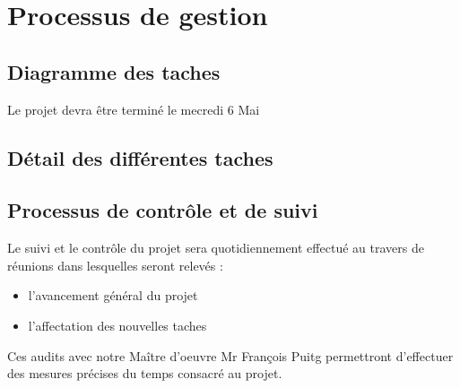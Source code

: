 
\section{Processus de gestion}
\subsection{Diagramme des taches}

Le projet devra être terminé le mecredi 6 Mai

\subsection{Détail des différentes taches}


\subsection{Processus de contrôle et de suivi}

Le suivi et le contrôle du projet sera quotidiennement effectué au travers de réunions dans lesquelles seront relevés : 
\begin{itemize}
 \item l'avancement général du projet
 \item l'affectation des nouvelles taches
\end{itemize}

Ces audits avec notre Maître d’oeuvre Mr François Puitg permettront d'effectuer des mesures précises du temps consacré au projet.



